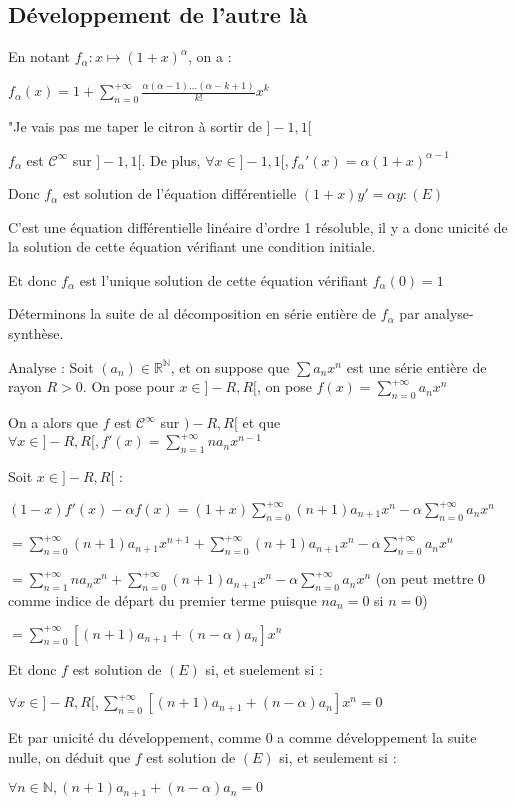 \documentclass[a4paper,12pt]{book}
\newcommand{\Pre}[1]{\begin{tcolorbox}[sharp corners, colback=white,colframe=green!60!green!30!black!75, title=Preuve]#1\end{tcolorbox}}
\def\R{\mathbb{R}}
\def\N{\mathbb{N}}
\begin{document}
\subsection{Développement de l'autre là}
En notant $f_\alpha :x\mapsto (1+x)^\alpha$, on a :
\par \begin{center} $f_\alpha(x)=1+\sum\limits_{n=0}^{+\infty}\frac{\alpha(\alpha-1)...(\alpha-k+1)}{k!}x^k$ \end{center}
\par "Je vais pas me taper le citron à sortir de $]-1,1[$
\Pre{$f_\alpha$ est $\mathcal{C}^\infty$ sur $]-1,1[$. De plus, $\forall x\in]-1,1[, f_\alpha'(x) = \alpha(1+x)^{\alpha-1}$
\par Donc $f_\alpha$ est solution de l'équation différentielle $(1+x)y'=\alpha y : (E)$ \par C'est une équation différentielle linéaire d'ordre 1 résoluble, il y a donc unicité de la solution de cette équation vérifiant une condition initiale. \par Et donc $f_\alpha$ est l'unique solution de cette équation vérifiant $f_\alpha(0)=1$
\par Déterminons la suite de al décomposition en série entière de $f_\alpha$ par analyse-synthèse. \par Analyse : Soit $(a_n)\in\R^\N$, et on suppose que $\sum a_nx^n$ est une série entière de rayon $R>0$. On pose pour $x\in]-R,R[$, on pose $f(x)=\sum\limits_{n=0}^{+\infty}a_nx^n$
\par On a alors que $f$ est $\mathcal{C}^\infty$ sur $)-R,R[$ et que $\forall x\in ]-R,R[, f'(x) = \sum\limits_{n=1}^{+\infty}na_nx^{n-1}$
\par Soit $x\in]-R,R[$ : \par $(1-x)f'(x)-\alpha f(x) =(1+x) \sum\limits_{n=0}^{+\infty} (n+1)a_{n+1}x^n - \alpha \sum\limits_{n=0}^{+\infty}a_nx^n$ \par $=\sum\limits_{n=0}^{+\infty}(n+1)a_{n+1}x^{n+1} + \sum\limits_{n=0}^{+\infty}(n+1)a_{n+1}x^n -\alpha\sum\limits_{n=0}^{+\infty}a_nx^n$ \par $=\sum\limits_{n=1}^{+\infty}na_nx^n + \sum\limits_{n=0}^{+\infty}(n+1)a_{n+1}x^n -\alpha \sum\limits_{n=0}^{+\infty} a_nx^n$ (on peut mettre 0 comme indice de départ du premier terme puisque $na_n =0$ si $n=0$)
\par $=\sum\limits_{n=0}^{+\infty}\left[(n+1)a_{n+1}+(n-\alpha)a_n\right]x^n$ \par Et donc $f$ est solution de $(E)$ si, et suelement si : \par $\forall x\in]-R,R[, \sum\limits_{n=0}^{+\infty}[(n+1)a_{n+1}+(n-\alpha)a_n]x^n=0$ \par Et par unicité du développement, comme $0$ a comme développement la suite nulle, on déduit que $f$ est solution de $(E)$ si, et seulement si :\par $\forall n\in\N, (n+1)a_{n+1}+(n-\alpha)a_n=0$
}
\end{document}

